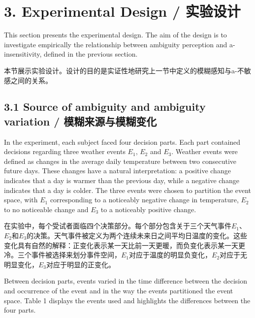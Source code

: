 \documentclass[12pt,a4paper]{article}
\newenvironment{original}
  {\par\medskip\noindent\color{black}\ignorespaces}
  {\par\medskip}
\newenvironment{translation}
  {\par\noindent\color{transblue}\ignorespaces}
  {\par\medskip\medskip}
\begin{document}
\section{3. Experimental Design / 实验设计}

\begin{original}
This section presents the experimental design. The aim of the design is to investigate empirically the relationship between ambiguity perception and a-insensitivity, defined in the previous section.
\end{original}

\begin{translation}
本节展示实验设计。设计的目的是实证性地研究上一节中定义的模糊感知与a-不敏感之间的关系。
\end{translation}

\subsection{3.1 Source of ambiguity and ambiguity variation / 模糊来源与模糊变化}

\begin{original}
In the experiment, each subject faced four decision parts. Each part contained decisions regarding three weather events $E_1$, $E_2$ and $E_3$. Weather events were defined as changes in the average daily temperature between two consecutive future days. These changes have a natural interpretation: a positive change indicates that a day is warmer than the previous day, while a negative change indicates that a day is colder. The three events were chosen to partition the event space, with $E_1$ corresponding to a noticeably negative change in temperature, $E_2$ to no noticeable change and $E_3$ to a noticeably positive change.
\end{original}

\begin{translation}
在实验中，每个受试者面临四个决策部分。每个部分包含关于三个天气事件$E_1$、$E_2$和$E_3$的决策。天气事件被定义为两个连续未来日之间平均日温度的变化。这些变化具有自然的解释：正变化表示某一天比前一天更暖，而负变化表示某一天更冷。三个事件被选择来划分事件空间，$E_1$对应于温度的明显负变化，$E_2$对应于无明显变化，$E_3$对应于明显的正变化。
\end{translation}

\begin{original}
Between decision parts, events varied in the time difference between the decision and occurrence of the event and in the way the events partitioned the event space. Table 1 displays the events used and highlights the differences between the four parts.
\end{original}
\end{document}
